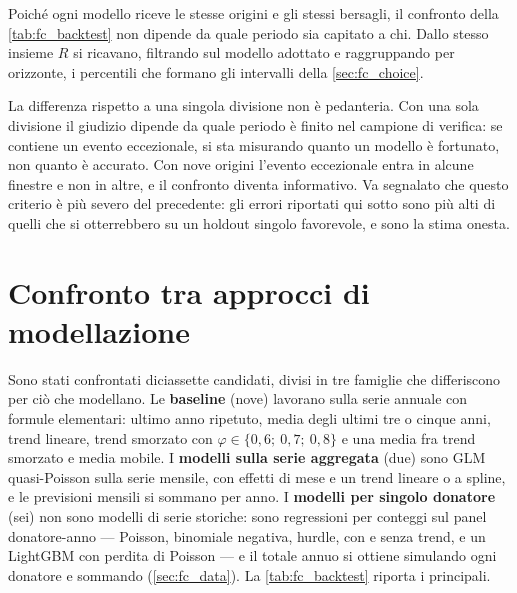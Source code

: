 Poiché ogni modello riceve le stesse origini e gli stessi bersagli, il confronto
della \cref{tab:fc_backtest} non dipende da quale periodo sia capitato a chi.
Dallo stesso insieme $R$ si ricavano, filtrando sul modello adottato e
raggruppando per orizzonte, i percentili che formano gli intervalli della
\cref{sec:fc_choice}.

La differenza rispetto a una singola divisione non è pedanteria. Con una sola
divisione il giudizio dipende da quale periodo è finito nel campione di
verifica: se contiene un evento eccezionale, si sta misurando quanto un modello
è fortunato, non quanto è accurato. Con nove origini l'evento eccezionale entra
in alcune finestre e non in altre, e il confronto diventa informativo. Va
segnalato che questo criterio è più severo del precedente: gli errori riportati
qui sotto sono più alti di quelli che si otterrebbero su un holdout singolo
favorevole, e sono la stima onesta.

\section{Confronto tra approcci di modellazione}
\label{sec:fc_models}

Sono stati confrontati diciassette candidati, divisi in tre famiglie che
differiscono per ciò che modellano. Le \textbf{baseline} (nove) lavorano sulla
serie annuale con formule elementari: ultimo anno ripetuto, media degli ultimi
tre o cinque anni, trend lineare, trend smorzato con $\varphi \in \{0{,}6;\
0{,}7;\ 0{,}8\}$ e una media fra trend smorzato e media mobile. I
\textbf{modelli sulla serie aggregata} (due) sono GLM quasi-Poisson sulla serie
mensile, con effetti di mese e un trend lineare o a spline, e le previsioni
mensili si sommano per anno. I \textbf{modelli per singolo donatore} (sei) non
sono modelli di serie storiche: sono regressioni per conteggi sul panel
donatore-anno --- Poisson, binomiale negativa, hurdle, con e senza trend, e un
LightGBM con perdita di Poisson --- e il totale annuo si ottiene simulando ogni
donatore e sommando (\cref{sec:fc_data}). La \cref{tab:fc_backtest} riporta i
principali.

